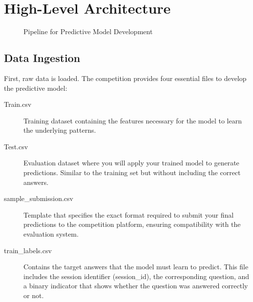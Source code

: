 \documentclass{article}
\begin{document}
\section{High-Level Architecture}

\begin{figure}[h]
    \centering
    \caption{Pipeline for Predictive Model Development}
    \end{figure}

\subsection*{Data Ingestion}

First, raw data is loaded. The competition provides four essential files to develop the predictive model:

\begin{description}
  \item[Train.csv] Training dataset containing the features necessary for the model to learn the underlying patterns.
  
  \item[Test.csv] Evaluation dataset where you will apply your trained model to generate predictions. Similar to the training set but without including the correct answers.
  
  \item[sample\_submission.csv] Template that specifies the exact format required to submit your final predictions to the competition platform, ensuring compatibility with the evaluation system.
  
  \item[train\_labels.csv] Contains the target answers that the model must learn to predict. This file includes the session identifier (session\_id), the corresponding question, and a binary indicator that shows whether the question was answered correctly or not.
\end{description}
\end{document}
